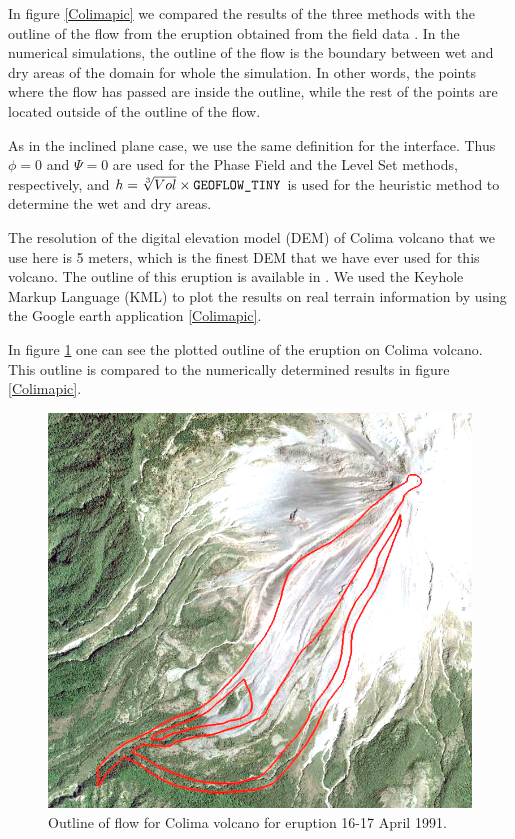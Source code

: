 \documentclass[review]{elsarticle}
\begin{document}
In figure \ref{Colimapic} we compared the results of the three methods with the outline of the flow from the eruption obtained from the field data \cite{Rupp2006}. 
In the numerical simulations, the outline of the flow is the boundary between wet and dry areas of the domain for whole the simulation. In other words, the points where the flow has
passed are inside the outline, while the rest of the points are located outside of the outline of the flow. 

As in the inclined plane case, we use the same definition for the interface.
Thus $\phi=0$ and $\varPsi=0$ are used for the Phase Field and the Level Set methods, respectively, and $h=\sqrt[3]{Vol} \times {\rm\verb1GEOFLOW_TINY1} $ 
is used for the heuristic method to determine the wet and dry areas.
 
The resolution of the digital elevation model (DEM) of Colima volcano that we use here is 5 meters, which is the finest DEM 
that we have ever used for this volcano.
The outline of this eruption is available in \cite{NamikawaPhD}.
We used the Keyhole Markup Language (KML) to plot the results on real terrain information by using the Google earth application \ref{Colimapic}. 

In figure \ref{colima_outline} one can see the plotted outline of the eruption on Colima volcano. 
This outline is compared to the numerically determined results in figure \ref{Colimapic}.

\begin{figure}[H]
\centering
\includegraphics[width=.5\textwidth]{IMAGES/outline1.png}
\caption{Outline of flow for Colima volcano for eruption 16-17 April 1991.}
 \label{colima_outline}

\end{figure}
\end{document}
